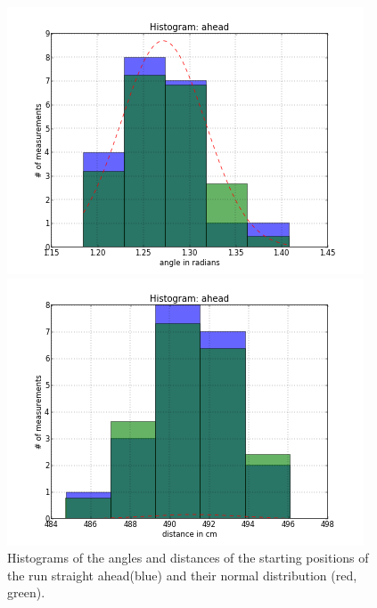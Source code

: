 \documentclass{scrartcl}
\begin{document}
\begin{figure}[H]
\centering
\begin{minipage}{.5\textwidth}
  \centering
  \includegraphics[width=1.0\linewidth]{img/Angles_ahead_s.png}
\end{minipage}%
\begin{minipage}{.5\textwidth}
  \centering
  \includegraphics[width=1.0\linewidth]{img/Distances_ahead_s.png}
\end{minipage}
\caption{Histograms of the angles and distances of the starting positions of the run straight ahead(blue) and their normal distribution (red, green).}
\end{figure}
\end{document}
